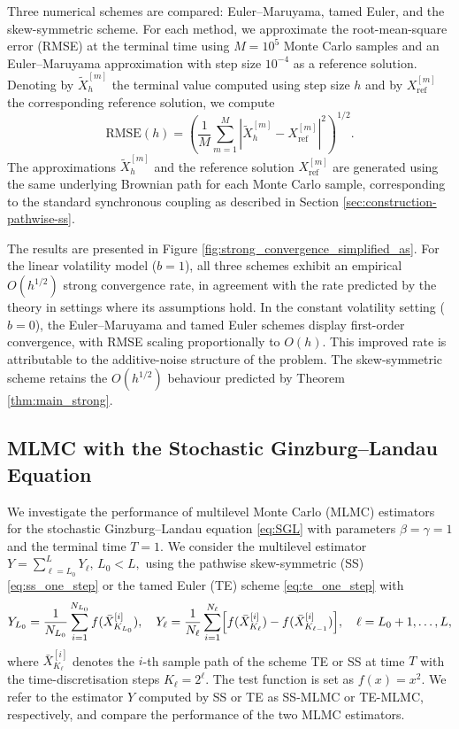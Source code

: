 \documentclass[11pt]{article}
\begin{document}
Three numerical schemes are compared: Euler--Maruyama, tamed Euler, and the skew-symmetric scheme. For each method, we approximate the root-mean-square error (RMSE) at the terminal time using $M=10^5$ Monte Carlo samples and an Euler--Maruyama approximation with step size $10^{-4}$ as a reference solution. Denoting by $\widetilde{X}_h^{[m]}$ the terminal value computed using step size $h$ and by $X_{\mathrm{ref}}^{[m]}$ the corresponding reference solution, we compute
\[
\mathrm{RMSE}(h) = \left( \frac{1}{M} \sum_{m=1}^{M} \left| \widetilde{X}_h^{[m]} - X_{\mathrm{ref}}^{[m]} \right|^2 \right)^{1/2}.
\]
The approximations $\widetilde{X}_h^{[m]}$ and the reference solution $X_{\mathrm{ref}}^{[m]}$ are generated using the same underlying Brownian path for each Monte Carlo sample, corresponding to the standard synchronous coupling as described in Section \ref{sec:construction-pathwise-ss}.

The results are presented in Figure \ref{fig:strong_convergence_simplified_as}. For the linear volatility model ($b=1$), all three schemes exhibit an empirical $O(h^{1/2})$ strong convergence rate, in agreement with the rate predicted by the theory in settings where its assumptions hold. In the constant volatility setting ($b=0$), the Euler--Maruyama and tamed Euler schemes display first-order convergence, with RMSE scaling proportionally to $O(h)$. This improved rate is attributable to the additive-noise structure of the problem. The skew-symmetric scheme retains the $O(h^{1/2})$ behaviour predicted by Theorem \ref{thm:main_strong}.

\subsection{MLMC with the Stochastic Ginzburg--Landau Equation}\label{sec:numerical.mlmc}
We investigate the performance of multilevel Monte Carlo (MLMC) estimators for the stochastic Ginzburg--Landau equation \eqref{eq:SGL} with parameters $\beta= \gamma=1$ and the terminal time $T = 1$. We consider the multilevel estimator $Y = \sum_{\ell = L_0 }^L Y_\ell, \, L_0 < L,$ using the pathwise skew-symmetric (SS) \eqref{eq:ss_one_step} or the tamed Euler (TE) scheme \eqref{eq:te_one_step} with 
% 
\begin{align*}
{Y}_{L_0}  = \frac{1}{N_{L_0}} \sum_{i = 1}^{N_{L_0}} 
f (\bar{X}_{K_{L_0}}^{[i]}), \quad 
Y_{\ell} =  \frac{1}{N_\ell} \sum_{i = 1}^{N_\ell} \Bigl[ f (\bar{X}_{K_\ell}^{[i]}) - f (\bar{X}_{K_{\ell - 1}}^{[i]})  \Bigr],  
\quad  \ell = L_0 + 1, \ldots, L, 
\end{align*} 
% 
where $\bar{X}_{K_\ell}^{[i]}$ denotes the $i$-th sample path of the scheme TE or SS at time $T$ with the time-discretisation steps $K_\ell = 2^\ell$. The test function is set as $f(x) = x^2$. We refer to the estimator $Y$ computed by SS or TE as SS-MLMC or TE-MLMC, respectively, and compare the performance of the two MLMC estimators. 
\end{document}
